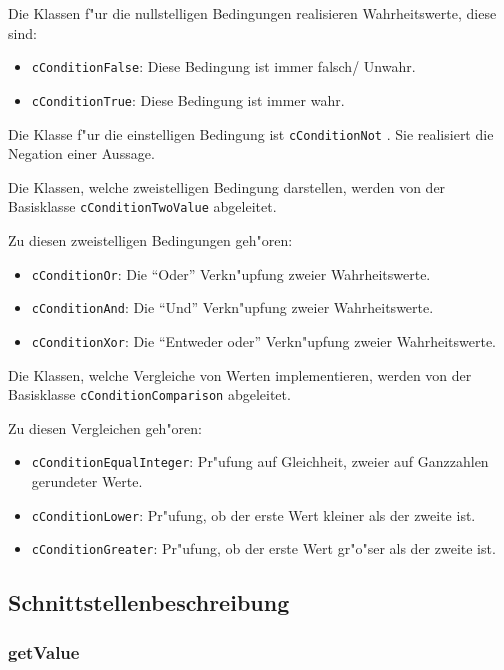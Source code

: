 \bigskip\noindent
Die Klassen f"ur die nullstelligen Bedingungen realisieren Wahrheitswerte, diese sind:
\begin{itemize}
 \item \verb|cConditionFalse|: Diese Bedingung ist immer falsch/ Unwahr.
 \item \verb|cConditionTrue|: Diese Bedingung ist immer wahr.
\end{itemize}

\bigskip\noindent
Die Klasse f"ur die einstelligen Bedingung ist \verb|cConditionNot| . Sie realisiert die Negation einer Aussage.

\bigskip\noindent
Die Klassen, welche zweistelligen Bedingung darstellen, werden von der Basisklasse \verb|cConditionTwoValue| abgeleitet.

\bigskip\noindent
Zu diesen zweistelligen Bedingungen geh"oren:
\begin{itemize}
 \item \verb|cConditionOr|: Die ``Oder'' Verkn"upfung zweier Wahrheitswerte.
 \item \verb|cConditionAnd|: Die ``Und'' Verkn"upfung zweier Wahrheitswerte.
 \item \verb|cConditionXor|: Die ``Entweder oder'' Verkn"upfung zweier Wahrheitswerte.
\end{itemize}

\bigskip\noindent
Die Klassen, welche Vergleiche von Werten implementieren, werden von der Basisklasse \verb|cConditionComparison| abgeleitet.

\bigskip\noindent
Zu diesen Vergleichen geh"oren:
\begin{itemize}
 \item \verb|cConditionEqualInteger|: Pr"ufung auf Gleichheit, zweier auf Ganzzahlen gerundeter Werte.
 \item \verb|cConditionLower|: Pr"ufung, ob der erste Wert kleiner als der zweite ist.
 \item \verb|cConditionGreater|: Pr"ufung, ob der erste Wert gr"o"ser als der zweite ist.
\end{itemize}


\subsection{Schnittstellenbeschreibung}

\subsubsection{getValue}

